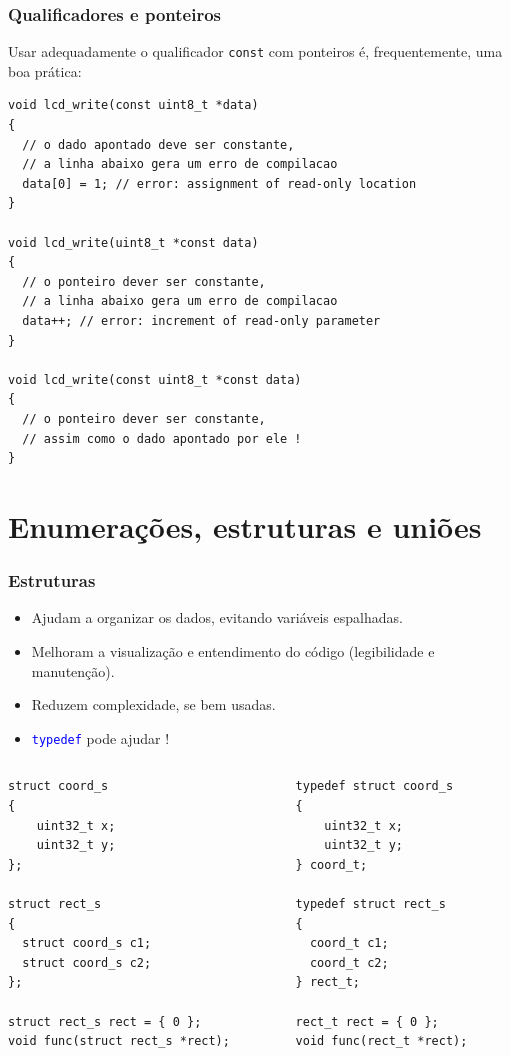 \documentclass{beamer}
\begin{document}
	
\begin{frame}[fragile]
	\frametitle{Qualificadores e ponteiros}
    Usar adequadamente o qualificador \texttt{const} com ponteiros é, frequentemente, uma boa prática:
		\vspace*{0.5cm}
	\begin{lstlisting}[style=customc]
void lcd_write(const uint8_t *data)
{
  // o dado apontado deve ser constante,
  // a linha abaixo gera um erro de compilacao
  data[0] = 1; // error: assignment of read-only location
}

void lcd_write(uint8_t *const data)
{
  // o ponteiro dever ser constante,
  // a linha abaixo gera um erro de compilacao
  data++; // error: increment of read-only parameter
}

void lcd_write(const uint8_t *const data)
{
  // o ponteiro dever ser constante,
  // assim como o dado apontado por ele !
}
	\end{lstlisting}
\end{frame}

\section{Enumerações, estruturas e uniões}

\begin{frame}[fragile]
	\frametitle{Estruturas}
	\begin{itemize}
	\item Ajudam a organizar os dados, evitando variáveis espalhadas.
	\item Melhoram a visualização e entendimento do código (legibilidade e manutenção).
	\item Reduzem complexidade, se bem usadas.
	\item \texttt{\textcolor{blue}{typedef}} pode ajudar !
	\end{itemize}
	\begin{columns}[T] %
		\begin{column}{.5\textwidth}
	\begin{lstlisting}[style=customc]
struct coord_s
{
	uint32_t x;
	uint32_t y;
};

struct rect_s
{
  struct coord_s c1;
  struct coord_s c2;
};

struct rect_s rect = { 0 };
void func(struct rect_s *rect);
	\end{lstlisting}
		\end{column}%
		\hfill%
		\begin{column}{.5\textwidth}
	\begin{lstlisting}[style=customc]
typedef struct coord_s
{
	uint32_t x;
	uint32_t y;
} coord_t;

typedef struct rect_s
{
  coord_t c1;
  coord_t c2;
} rect_t;

rect_t rect = { 0 };
void func(rect_t *rect);
	\end{lstlisting}
		\end{column}%
	\end{columns}
\end{frame}
\end{document}
